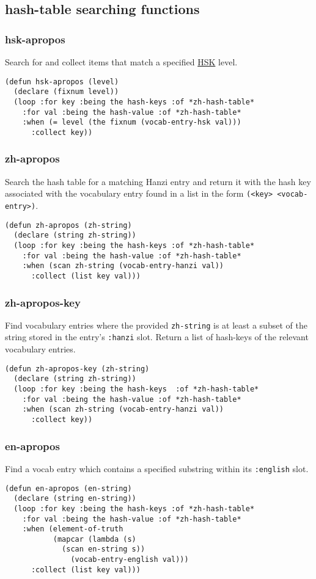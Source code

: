 \documentclass[11pt]{article}
\begin{document}
\subsection{hash-table searching functions}
\label{sec-4-5}
\subsubsection*{hsk-apropos}
\label{sec-4-5-1}
Search for and collect items that match a specified \href{http://en.wikipedia.org/wiki/Hanyu_Shuiping_Kaoshi}{HSK} level.
\begin{verbatim}
(defun hsk-apropos (level)
  (declare (fixnum level))
  (loop :for key :being the hash-keys :of *zh-hash-table*
	:for val :being the hash-value :of *zh-hash-table*
	:when (= level (the fixnum (vocab-entry-hsk val)))
	  :collect key))
\end{verbatim}
\subsubsection*{zh-apropos}
\label{sec-4-5-2}
Search the hash table for a matching Hanzi entry and return it with the hash key
associated with the vocabulary entry found in a list in the form \texttt{(<key>
<vocab-entry>)}.
\begin{verbatim}
(defun zh-apropos (zh-string)
  (declare (string zh-string))
  (loop :for key :being the hash-keys :of *zh-hash-table*
	:for val :being the hash-value :of *zh-hash-table*
	:when (scan zh-string (vocab-entry-hanzi val))
	  :collect (list key val)))
\end{verbatim}
\subsubsection*{zh-apropos-key}
\label{sec-4-5-3}
Find vocabulary entries where the provided \texttt{zh-string} is at least a subset of
the string stored in the entry's \texttt{:hanzi} slot. Return a list of hash-keys of
the relevant vocabulary entries.
\begin{verbatim}
(defun zh-apropos-key (zh-string)
  (declare (string zh-string))
  (loop :for key :being the hash-keys  :of *zh-hash-table*
	:for val :being the hash-value :of *zh-hash-table*
	:when (scan zh-string (vocab-entry-hanzi val))
	  :collect key))
\end{verbatim}
\subsubsection*{en-apropos}
\label{sec-4-5-4}
Find a vocab entry which contains a specified substring within its \texttt{:english} slot.
\begin{verbatim}
(defun en-apropos (en-string)
  (declare (string en-string))
  (loop :for key :being the hash-keys :of *zh-hash-table*
	:for val :being the hash-value :of *zh-hash-table*
	:when (element-of-truth
	       (mapcar (lambda (s)
			 (scan en-string s))
		       (vocab-entry-english val)))
	  :collect (list key val)))
\end{verbatim}
\end{document}
